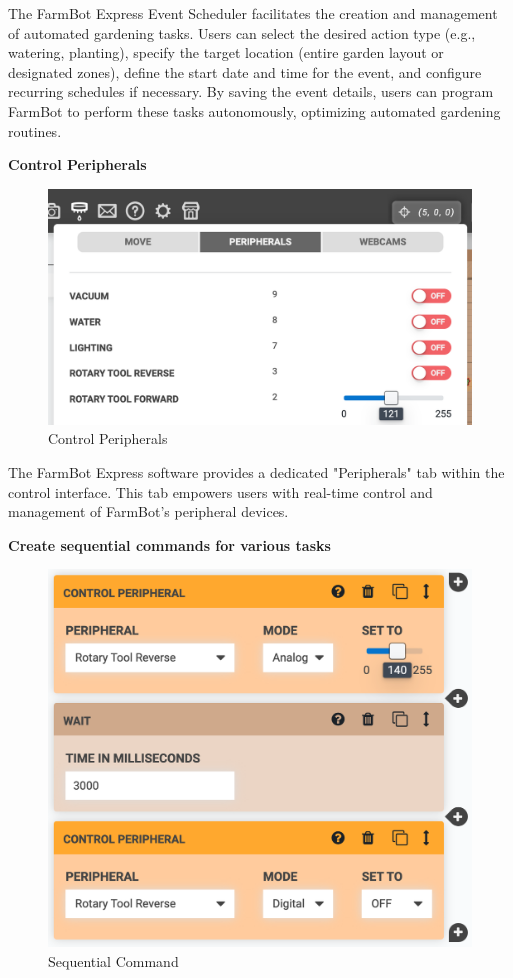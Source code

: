 \begin{itemize}
    
    The FarmBot Express Event Scheduler facilitates the creation and management of automated gardening tasks. Users can select the desired action type (e.g., watering, planting), specify the target location (entire garden layout or designated zones), define the start date and time for the event, and configure recurring schedules if necessary. By saving the event details, users can program FarmBot to perform these tasks autonomously, optimizing automated gardening routines.
    

    
    \textbf{Control Peripherals}

    \begin{figure}[H]
        \centering
        \includegraphics[width=0.6\linewidth]{Figures/ui_peripherals.png}
        \caption{Control Peripherals}
        \label{fig:ui_peri}
    \end{figure}

    The FarmBot Express software provides a dedicated "Peripherals" tab within the control interface. This tab empowers users with real-time control and management of FarmBot's peripheral devices.

    \textbf{Create sequential commands for various tasks}
    
    \begin{figure}[H]
        \centering
        \includegraphics[width=0.6\linewidth]{Figures/ui_seq.png}
        \caption{Sequential Command}
        \label{fig:ui_seq}
    \end{figure}


\end{itemize}
